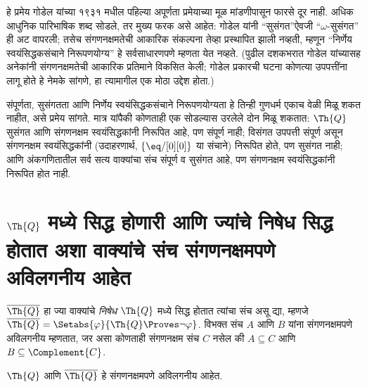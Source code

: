 \begin{explain}
हे प्रमेय गोडेल यांच्या १९३१ मधील पहिल्या अपूर्णता प्रमेयाच्या
मूळ मांडणीपासून फारसे दूर नाही. अधिक आधुनिक पारिभाषिक शब्द
सोडले, तर मुख्य फरक असे आहेत: गोडेल यांनी ``सुसंगत''ऐवजी
``$\omega$-सुसंगत'' ही अट वापरली; तसेच संगणनक्षमतेची आकारिक
संकल्पना तेव्हा प्रस्थापित झाली नव्हती, म्हणून ``निर्णेय स्वयंसिद्धकसंचाने निरूपणयोग्य''
हे सर्वसाधारणपणे म्हणता येत नव्हते. (पुढील दशकभरात गोडेल
यांच्यासह अनेकांनी संगणनक्षमतेची आकारिक प्रतिमाने विकसित केली;
गोडेल प्रकारची घटना कोणत्या उपपत्तींना लागू होते हे नेमके
सांगणे, हा त्यामागील एक मोठा उद्देश होता.)

संपूर्णता, सुसंगतता आणि निर्णेय स्वयंसिद्धकसंचाने निरूपणयोग्यता हे तिन्ही गुणधर्म
एकाच वेळी मिळू शकत नाहीत, असे प्रमेय सांगते. मात्र यांपैकी
कोणताही एक सोडल्यास उरलेले दोन मिळू शकतात: $\Th{Q}$ सुसंगत
आणि संगणनक्षम स्वयंसिद्धकांनी निरूपित आहे, पण संपूर्ण नाही;
विसंगत उपपत्ती संपूर्ण असून संगणनक्षम स्वयंसिद्धकांनी
(उदाहरणार्थ, $\{ \eq/[0][0] \}$ या संचाने) निरूपित होते,
पण सुसंगत नाही; आणि अंकगणितातील सर्व सत्य वाक्यांचा संच
संपूर्ण व सुसंगत आहे, पण संगणनक्षम स्वयंसिद्धकांनी
निरूपित होत नाही.
\end{explain}











\section[Q मध्ये सिद्ध होणारी आणि ज्यांचे निषेध सिद्ध होतात अशा वाक्यांचे संच संगणनक्षमपणे अविलगनीय आहेत]{$\Th{Q}$ मध्ये सिद्ध होणारी आणि ज्यांचे निषेध सिद्ध होतात
  अशा वाक्यांचे संच संगणनक्षमपणे अविलगनीय आहेत}\label{inc:tcp:ins:sec}


$\overline{\Th{Q}}$ हा ज्या वाक्यांचे {\em निषेध} $\Th{Q}$ मध्ये
सिद्ध होतात त्यांचा संच असू द्या, म्हणजे
$\overline{\Th{Q}} = \Setabs{\varphi}{\Th{Q} \Proves
  \lnot \varphi}$. विभक्त संच $A$ आणि $B$ यांना
संगणनक्षमपणे अविलगनीय म्हणतात, जर असा कोणताही
संगणनक्षम संच $C$ नसेल की $A \subseteq C$ आणि
$B \subseteq \Complement{C}$.

\begin{lem}
$\Th{Q}$ आणि $\overline{\Th{Q}}$ हे संगणनक्षमपणे अविलगनीय आहेत.
\end{lem}

